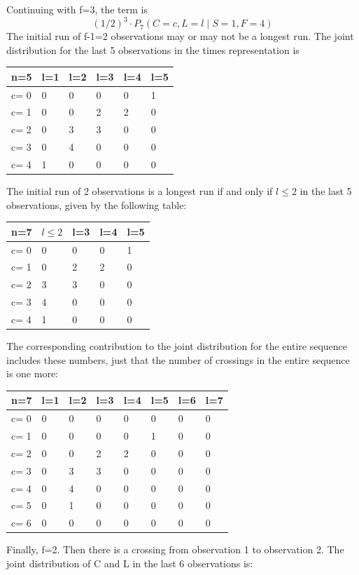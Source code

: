 Continuing with f=3, the term is $$(1/2)^3 \cdot   P_7 (C=c, L=l \mid S=1,F=4)$$
The initial run of f-1=2 observations may or may not be a longest run. The joint distribution for the last 5 observations in the times representation is 

\begin{tabular}{l | l l l l l}
\hline
n=5&l=1&l=2&l=3&l=4&l=5\\
\hline
c= 0& 0& 0& 0& 0& 1\\
c= 1& 0& 0& 2& 2& 0\\
c= 2& 0& 3& 3& 0& 0\\
c= 3& 0& 4& 0& 0& 0\\
c= 4& 1& 0& 0& 0& 0\\
\hline
\end{tabular}

The initial run of 2 observations is a longest run if and only if $l \leq 2$ in the last 5 observations, given by the following table:

\begin{tabular}{l | l l l l}
\hline
n=7&$l \leq 2$&l=3&l=4&l=5\\
\hline
c= 0& 0& 0& 0& 1\\
c= 1& 0& 2& 2& 0\\
c= 2& 3& 3& 0& 0\\
c= 3& 4& 0& 0& 0\\
c= 4& 1& 0& 0& 0\\
\hline
\end{tabular}

The corresponding contribution to the joint distribution for the entire sequence includes these numbers, just that the number of crossings in the entire sequence is one more:

\begin{tabular}{l | l l l l l l l}
\hline
n=7&l=1&l=2&l=3&l=4&l=5&l=6&l=7\\
\hline
c= 0& 0& 0& 0& 0& 0& 0& 0\\
c= 1& 0& 0& 0& 0& 1& 0& 0\\
c= 2& 0& 0& 2& 2& 0& 0& 0\\
c= 3& 0& 3& 3& 0& 0& 0& 0\\
c= 4& 0& 4& 0& 0& 0& 0& 0\\
c= 5& 0& 1& 0& 0& 0& 0& 0\\
c= 6& 0& 0& 0& 0& 0& 0& 0\\
\hline
\end{tabular}

Finally, f=2. Then there is a crossing from observation 1 to observation 2. The joint distribution of C and L in the last 6 observations is:

